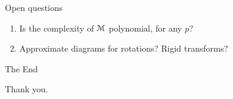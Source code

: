 \documentclass[xcolor={dvipsnames,usenames}]{beamer}
\newcommand{\M}{\EuScript{M}}
\begin{document}
\begin{frame}{Open questions}
\begin{enumerate}
\item Is the complexity of $\M$ polynomial, for any $p$?
\item Approximate diagrams for rotations? Rigid transforms?
\end{enumerate}
\end{frame}


\begin{frame}{The End}
\begin{center}
	Thank you.
\end{center}
\end{frame}

%
%
\end{document}
